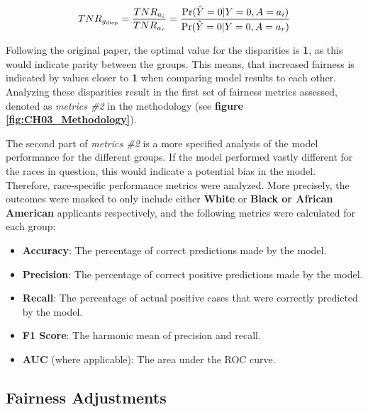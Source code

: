 \begin{equation}
    TNR_{g_{\text{disp}}} = \frac{TNR_{a_i}}{TNR_{a_r}} = \frac{\Pr(\hat{Y}=0 | Y=0, A=a_i)}{\Pr(\hat{Y}=0 | Y=0, A=a_r)}
    \label{eq:TNR_Disparity}
    \addcontentsline{frm}{formulas}{\protect\numberline{\theequation}\hspace{1em}TNR Disparity}
\end{equation}

Following the original paper, the optimal value for the disparities is \textbf{1}, as this would indicate parity between the groups. This means, that increased fairness is indicated by values closer to \textbf{1} when comparing model results to each other.
Analyzing these disparities result in the first set of fairness metrics assessed, denoted as \textit{metrics \#2} in the methodology (see \textbf{figure \ref{fig:CH03_Methodology}}).

The second part of \textit{metrics \#2} is a more specified analysis of the model performance for the different groups. If the model performed vastly different for the races in question, this would indicate a potential bias in the model. Therefore, race-specific performance metrics were analyzed.
More precisely, the outcomes were masked to only include either \textbf{White} or \textbf{Black or African American} applicants respectively, and the following metrics were calculated for each group:
\begin{itemize}
    \item \textbf{Accuracy}: The percentage of correct predictions made by the model.
    \item \textbf{Precision}: The percentage of correct positive predictions made by the model.
    \item \textbf{Recall}: The percentage of actual positive cases that were correctly predicted by the model.
    \item \textbf{F1 Score}: The harmonic mean of precision and recall.
    \item \textbf{AUC} (where applicable): The area under the ROC curve.
\end{itemize}


\subsection{Fairness Adjustments}\label{subsec:Iterations}

